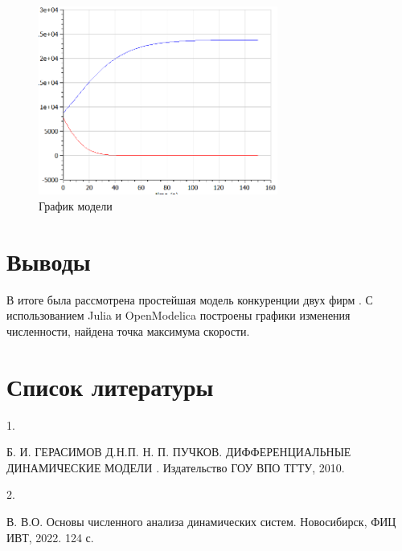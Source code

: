 \documentclass[
  12pt,
  a4paper,
]{scrreprt}
\newlength{\cslhangindent}
\newlength{\csllabelwidth}
\newlength{\cslentryspacingunit} %
\newenvironment{CSLReferences}[2] %
 {%
  \setlength{\parindent}{0pt}
  \ifodd #1
  \let\oldpar\par
  \def\par{\hangindent=\cslhangindent\oldpar}
  \fi
  \setlength{\parskip}{#2\cslentryspacingunit}
 }%
 {}
\newcommand{\CSLLeftMargin}[1]{\parbox[t]{\csllabelwidth}{#1}}
\newcommand{\CSLRightInline}[1]{\parbox[t]{\linewidth - \csllabelwidth}{#1}\break}
\begin{document}
\begin{enumerate}
  \begin{figure}
  \hypertarget{fig:008}{%
  \centering
  \includegraphics[width=0.7\textwidth,height=\textheight]{./tex2pdf.-eff22ba2c7041204/image/om2p.PNG}
  \caption{График модели}\label{fig:008}
  }
  \end{figure}
\end{enumerate}

\hypertarget{ux432ux44bux432ux43eux434ux44b}{%
\chapter{Выводы}\label{ux432ux44bux432ux43eux434ux44b}}

В итоге была рассмотрена простейшая модель конкуренции двух фирм . С
использованием Julia и OpenModelica построены графики изменения
численности, найдена точка максимума скорости.

\hypertarget{ux441ux43fux438ux441ux43eux43a-ux43bux438ux442ux435ux440ux430ux442ux443ux440ux44b}{%
\chapter*{Список
литературы}\label{ux441ux43fux438ux441ux43eux43a-ux43bux438ux442ux435ux440ux430ux442ux443ux440ux44b}}

\hypertarget{refs}{}
\begin{CSLReferences}{0}{0}
\leavevmode{}%
\CSLLeftMargin{1. }%
\CSLRightInline{Б. И. ГЕРАСИМОВ Д.Н.П. Н. П. ПУЧКОВ. {ДИФФЕРЕНЦИАЛЬНЫЕ
ДИНАМИЧЕСКИЕ МОДЕЛИ }. Издательство ГОУ ВПО ТГТУ, 2010.}

\leavevmode{}%
\CSLLeftMargin{2. }%
\CSLRightInline{В. В.О. {Основы численного анализа динамических систем}.
Новосибирск, ФИЦ ИВТ, 2022. 124 с.}

\end{CSLReferences}

\printbibliography
\end{document}
